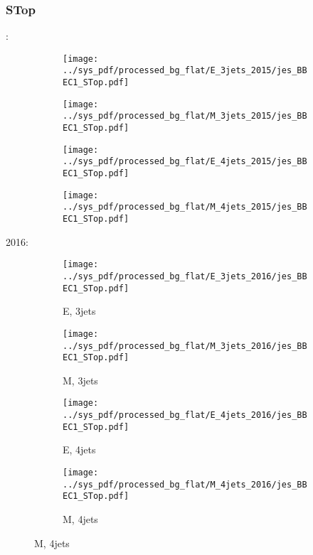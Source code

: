\documentclass{beamer}
\begin{document}
\begin{frame}
\frametitle{STop}
\fontsize{5}{1}:
\begin{figure}
\centering
\begin{subfigure}[b]{0.24\textwidth}
\texttt{[image: ../sys\_pdf/processed\_bg\_flat/E\_3jets\_2015/jes\_BBEC1\_STop.pdf]}
\end{subfigure}
\begin{subfigure}[b]{0.24\textwidth}
\texttt{[image: ../sys\_pdf/processed\_bg\_flat/M\_3jets\_2015/jes\_BBEC1\_STop.pdf]}
\end{subfigure}
\begin{subfigure}[b]{0.24\textwidth}
\texttt{[image: ../sys\_pdf/processed\_bg\_flat/E\_4jets\_2015/jes\_BBEC1\_STop.pdf]}
\end{subfigure}
\begin{subfigure}[b]{0.24\textwidth}
\texttt{[image: ../sys\_pdf/processed\_bg\_flat/M\_4jets\_2015/jes\_BBEC1\_STop.pdf]}
\end{subfigure}
\end{figure}
2016:
\begin{figure}
\centering
\begin{subfigure}[b]{0.24\textwidth}
\texttt{[image: ../sys\_pdf/processed\_bg\_flat/E\_3jets\_2016/jes\_BBEC1\_STop.pdf]}
\captionsetup{font=tiny}
\caption{E, 3jets}
\end{subfigure}
\begin{subfigure}[b]{0.24\textwidth}
\texttt{[image: ../sys\_pdf/processed\_bg\_flat/M\_3jets\_2016/jes\_BBEC1\_STop.pdf]}
\captionsetup{font=tiny}
\caption{M, 3jets}
\end{subfigure}
\begin{subfigure}[b]{0.24\textwidth}
\texttt{[image: ../sys\_pdf/processed\_bg\_flat/E\_4jets\_2016/jes\_BBEC1\_STop.pdf]}
\captionsetup{font=tiny}
\caption{E, 4jets}
\end{subfigure}
\begin{subfigure}[b]{0.24\textwidth}
\texttt{[image: ../sys\_pdf/processed\_bg\_flat/M\_4jets\_2016/jes\_BBEC1\_STop.pdf]}
\captionsetup{font=tiny}
\caption{M, 4jets}
\end{subfigure}
\end{figure}
\end{frame}
\end{document}
